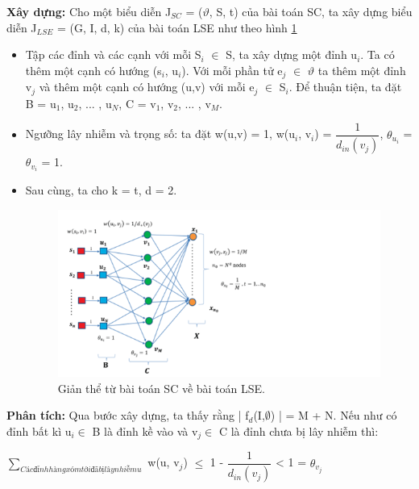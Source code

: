  		{\bfseries Xây dựng:} Cho một biểu diễn J$_{SC}$ = ($\vartheta$, S, t) của bài toán SC, ta xây dựng biểu diễn J$_{LSE}$ = (G, I, d, k) của bài toán LSE như theo hình \ref{refhinh3_3}
 		\begin {itemize}
 			\item Tập các đỉnh và các cạnh với mỗi S$_{i}$ $\in$ S, ta xây dựng một đỉnh u$_{i}$. Ta có thêm một cạnh có hướng (s$_{i}$, u$_{i}$). Với mỗi phần tử e$_{j}$ $\in$ $\vartheta$ ta thêm một đỉnh v$_{j}$ và thêm một cạnh có hướng (u,v) với mỗi e$_{j}$ $\in$ S$_{i}$. Để thuận tiện, ta đặt B = {u$_{1}$, u$_{2}$, ... , u$_{N}$}, C = {v$_{1}$, v$_{2}$, ... , v$_{M}$}.
 		
 			\item Ngưỡng lây nhiễm và trọng số: ta đặt w(u,v) = 1, w(u$_{i}$, v$_{i}$) = $\dfrac{1}{d_{in}(v_{j})}$, $\theta$$_{u_{i}}$ = $\theta$$_{v_{i}}$ = 1.
 		
 			\item Sau cùng, ta cho k = t, d = 2. 		
 		
 		\begin{center}
 			\begin{figure}[!htp]
 				\begin{center}
 					\includegraphics [scale=.5]{picture/Hinh3_3}
 				\end{center}
 				\caption{Giản thể từ bài toán SC về bài toán LSE.}
 				\label{refhinh3_3}
 			\end{figure}
 		\end{center}
 		\end {itemize}
 		{\bfseries Phân tích:} Qua bước xây dựng, ta thấy rằng | f$_{d}$(I,$\emptyset$) | = M + N. Nếu như có đỉnh bất kì u$_{i} \in$ B là đỉnh kề vào và v$_{j} \in$ C là đỉnh chưa bị lây nhiễm thì: 
 		\begin{center}
 			$\sum_{Các đỉnh hàng xóm tới đã bị lây nhiễm u}$ w(u, v$_{j}$) $\leq$ 1 - $\dfrac{1}{d_{in}(v_{j})}$ < 1 = $\theta_{v_{j}}$
 		\end{center}
 		
